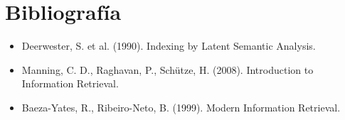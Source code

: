 \documentclass[12pt]{article}
\begin{document}
	\section{Bibliografía}
	
	\begin{itemize}
		\item Deerwester, S. et al. (1990). Indexing by Latent Semantic Analysis.
		\item Manning, C. D., Raghavan, P., Schütze, H. (2008). Introduction to Information Retrieval.
		\item Baeza-Yates, R., Ribeiro-Neto, B. (1999). Modern Information Retrieval.
	\end{itemize}
	
\end{document}

